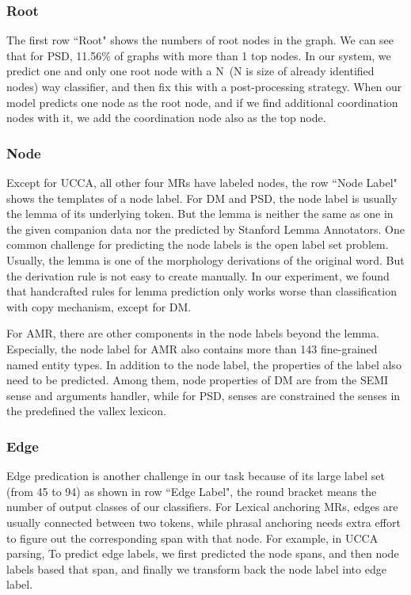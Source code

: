 \subsubsection{Root}
\label{sssec:lex:root}

The first row ``Root" shows the numbers of root nodes in the graph.
We can see that for PSD, 11.56\% of graphs with more than 1 top
nodes. In our system, we predict one and only one root node with a
N~(N is size of already identified nodes) way classifier, and then fix
this with a post-processing strategy. When our model predicts one node
as the root node, and if we find additional coordination nodes with
it, we add the coordination node also as the top node.

\subsubsection{Node}
\label{sssec:lex:node}

Except for UCCA, all other four MRs have labeled
nodes, the row ``Node Label" shows the templates of a node label. For
DM and PSD, the node label is usually the lemma of its underlying
token. But the lemma is neither the same as one in the given companion
data nor the predicted by Stanford Lemma Annotators. One common
challenge for predicting the node labels is the open label set
problem. Usually, the lemma is one of the morphology derivations of
the original word. But the derivation rule is not easy to create
manually. In our experiment, we found that handcrafted rules for lemma
prediction only works worse than classification with copy mechanism,
except for DM.

For AMR, there are other components in the node labels beyond the
lemma. Especially, the node label for AMR also contains more than 143
fine-grained named entity types. In addition to the node label, the
properties of the label also need to be predicted. Among them, node
properties of DM are from the SEMI sense and arguments handler, while
for PSD, senses are constrained the senses in the predefined the
vallex lexicon.

\subsubsection{Edge}
\label{sssec:lex:edge}

Edge predication is another challenge in our task
because of its large label set (from 45 to 94) as shown in row ``Edge
Label", the round bracket means the number of output classes of our
classifiers. For Lexical anchoring MRs, edges are usually connected
between two tokens, while phrasal anchoring needs extra effort to
figure out the corresponding span with that node. For example, in UCCA
parsing, To predict edge labels, we first predicted the node spans,
and then node labels based that span, and finally we transform back
the node label into edge label.

